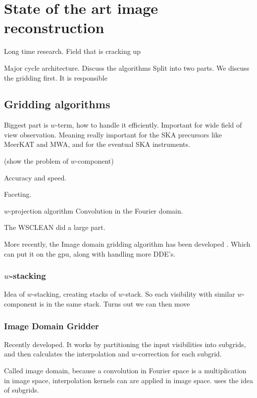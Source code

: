 \section{State of the art image reconstruction}
Long time research.
Field that is cracking up

Major cycle architecture.
Discuss the algorithms 
Split into two parts. We discuss the gridding first. It is responsible

\subsection{Gridding algorithms}
Biggest part is $w$-term, how to handle it efficiently. Important for wide field of view observation.
Meaning really important for the SKA precursors like MeerKAT and MWA, and for the eventual SKA instruments.

(show the problem of $w$-component)

Accuracy and speed.

Faceting.

$w$-projection algorithm \cite{cornwell2008noncoplanar}
Convolution in the Fourier domain.




 The WSCLEAN \cite{offringa2014wsclean} did a large part.

More recently, the Image domain gridding algorithm has been developed \cite{veenboer2017image}. Which can put it on the gpu, along with handling more DDE's.

\subsubsection{$w$-stacking}
Idea of $w$-stacking, creating stacks of $w$-stack. So each visibility with similar $w$-component is in the same stack. Turns out we can then move

\subsubsection{Image Domain Gridder}
Recently developed\cite{veenboer2017image}. It works by partitioning the input visibilities into subgrids, and then calculates the interpolation and $w$-correction for each subgrid.

Called image domain, because a convolution in Fourier space is a multiplication in image space, interpolation kernels can are applied in image space. uses the idea of subgrids.

